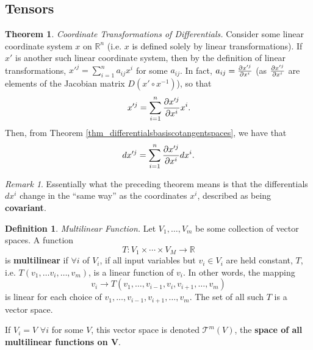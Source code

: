 \documentclass[10pt,landscape]{article}
\theoremstyle{definition}
\newtheorem{definition}{Definition}[section]
\theoremstyle{theorem}
\newtheorem{theorem}{Theorem}[section]
\theoremstyle{summary}
\theoremstyle{remark}
\newtheorem*{remark}{Remark}
\newcommand{\R}{\mathbb{R}}
\newcommand{\Rn}{\mathbb{R}^n}
\begin{document}
\begin{multicols*}{3}
\section{Tensors}

\theoremstyle{theorem}
\begin{theorem}{\textit{Coordinate Transformations of Differentials.}}
    \label{thm_coordtransdifferentials}
    Consider some linear coordinate system $x$ on $\Rn$ (i.e. $x$ is defined solely by linear transformations). If $x'$ is another such linear coordinate system, then by the definition of linear transformations, $x'^j=\sum\limits_{i=1}^na_{ij}x^i$ for some $a_{ij}$. In fact, $a_{ij} = \pdv{x'^j}{x^i}$ (as $\pdv{x'^j}{x^i}$ are elements of the Jacobian matrix $D(x'\circ x^{-1})$), so that
    \begin{equation}
        x'^j=\sum\limits_{i=1}^n\pdv{x'^j}{x^i}x^i.
    \end{equation}
    Then, from Theorem \ref{thm_differentialsbasiscotangentspaces}, we have that
    \begin{equation}
        dx'^j=\sum\limits_{i=1}^n\pdv{x'^j}{x^i}dx^i.
    \end{equation}
\end{theorem}

\begin{remark}
    Essentially what the preceding theorem means is that the differentials $dx^i$ change in the ``same way'' as the coordinates $x^i$, described as being \textbf{covariant}.
\end{remark}

\theoremstyle{definition}
\begin{definition}{\textit{Multilinear Function.}}
    Let $V_1,\ldots ,V_m$ be some collection of vector spaces. A function
    \begin{equation}
        T:V_1\times\cdots\times V_M\rightarrow \R
    \end{equation}
    is \textbf{multilinear} if $\forall i$ of $V_i$, if all input variables but $v_i\in V_i$ are held constant, $T$, i.e. $T(v_1,\ldots v_i,\ldots,v_m)$, is a linear function of $v_i$. In other words, the mapping
    \begin{equation}
        v_i\rightarrow T(v_1,\ldots,v_{i-1}, v_i, v_{i+1},\ldots,v_m)
    \end{equation}
    is linear for each choice of $v_1,\ldots,v_{i-1}, v_{i+1},\ldots,v_m$. The set of all such $T$ is a vector space.

    If $V_i=V$ $\forall i$ for some $V$, this vector space is denoted $\mathcal{T}^m(V)$, the \textbf{space of all multilinear functions on $\bm{V}$}.
\end{definition}


\end{multicols*}
\end{document}
